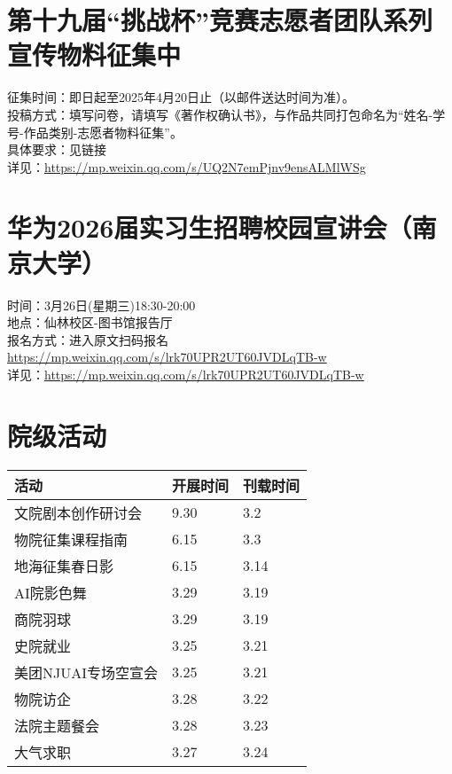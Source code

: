 \documentclass[letterpaper, 12pt]{article}
\begin{document}
\begin{multicols}{2}
\section{第十九届“挑战杯”竞赛志愿者团队系列宣传物料征集中}
征集时间：即日起至2025年4月20日止（以邮件送达时间为准）。
\\投稿方式：填写问卷，请填写《著作权确认书》，与作品共同打包命名为“姓名-学号-作品类别-志愿者物料征集”。
\\具体要求：见链接
\\详见：\url{https://mp.weixin.qq.com/s/UQ2N7emPjnv9ensALMlWSg}

\section{华为2026届实习生招聘校园宣讲会（南京大学）}
时间：3月26日(星期三)18:30-20:00
\\地点：仙林校区-图书馆报告厅
\\报名方式：进入原文扫码报名 \url{https://mp.weixin.qq.com/s/lrk70UPR2UT60JVDLqTB-w}
\\详见：\url{https://mp.weixin.qq.com/s/lrk70UPR2UT60JVDLqTB-w}

\section{院级活动}
\begin{tabular}{|>{\centering\arraybackslash}m{}|m{}|m{}|}
\hline
    活动 & 开展时间 & 刊载时间\\
    \hline\hline
    文院剧本创作研讨会 & 9.30 & 3.2\\
    物院征集课程指南 & 6.15 & 3.3\\
    地海征集春日影 & 6.15 & 3.14\\
    AI院影色舞 & 3.29 & 3.19\\
    商院羽球 & 3.29 & 3.19\\
    史院就业 & 3.25 & 3.21\\
    美团NJUAI专场空宣会 & 3.25 & 3.21\\
    物院访企 & 3.28 & 3.22\\
    法院主题餐会 & 3.28 & 3.23\\
    大气求职 & 3.27 & 3.24\\
    
    \hline
\end{tabular}

\end{multicols}
\end{document}
